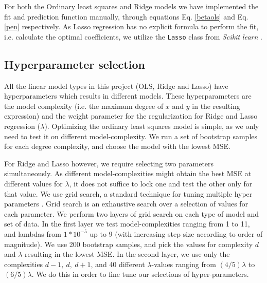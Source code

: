 For both the Ordinary least squares and Ridge models we have implemented the fit and prediction function manually, through equations Eq. \ref{betaols} and Eq. \ref{pen} respectively.
As Lasso regression has no explicit formula to perform the fit, i.e. calculate the optimal coefficients, we utilize the \texttt{Lasso} class from \textit{Scikit learn} \cite{sklearn}.

\subsection{Hyperparameter selection}
All the linear model types in this project (OLS, Ridge and Lasso) have hyperparameters which results in different models. 
These hyperparameters are the model complexity (i.e. the maximum degree of $x$ and $y$ in the resulting expression) and the weight parameter for the regularization for Ridge and Lasso regression ($\lambda$). 
Optimizing the ordinary least squares model is simple, as we only need to test it on different model-complexity. 
We run a set of bootstrap samples for each degree complexity, and choose the model with the lowest MSE.

For Ridge and Lasso however, we require selecting two parameters simultaneously. As different model-complexities might obtain the best MSE at different values for $\lambda$, it does not suffice to lock one and test the other only for that value. 
We use grid search, a standard technique for tuning multiple hyper parameters \citep[p. 302]{grid_search}.
Grid search is an exhaustive search over a selection of values for each parameter. 
We perform two layers of grid search on each type of model and set of data. 
In the first layer we test model-complexities ranging from 1 to 11, and lambdas from $1*10^{-5}$ up to $9$ (with increasing step size according to order of magnitude). 
We use 200 bootstrap samples, and pick the values for complexity $d$ and $\lambda$ resulting in the lowest MSE. 
In the second layer, we use only the complexities $d-1,\ d,\ d+1$, and 40 different $\lambda$-values ranging from $(4/5)\lambda$ to $(6/5)\lambda$. 
We do this in order to fine tune our selections of hyper-parameters.
